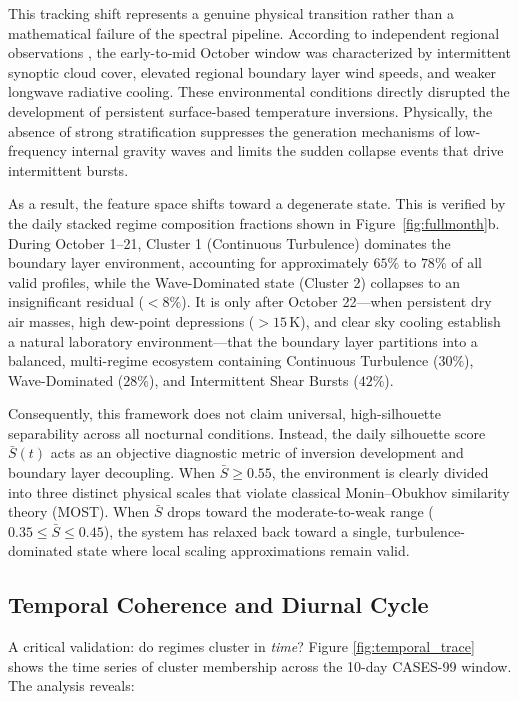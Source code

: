 \documentclass[11pt,a4paper]{article}
\begin{document}
This tracking shift represents a genuine physical transition rather than a mathematical failure of the spectral pipeline. According to independent regional observations \citep{Poulos2002}, the early-to-mid October window was characterized by intermittent synoptic cloud cover, elevated regional boundary layer wind speeds, and weaker longwave radiative cooling. These environmental conditions directly disrupted the development of persistent surface-based temperature inversions. Physically, the absence of strong stratification suppresses the generation mechanisms of low-frequency internal gravity waves and limits the sudden collapse events that drive intermittent bursts.

As a result, the feature space shifts toward a degenerate state. This is verified by the daily stacked regime composition fractions shown in Figure~\ref{fig:fullmonth}b. During October 1--21, Cluster 1 (Continuous Turbulence) dominates the boundary layer environment, accounting for approximately $65\%$ to $78\%$ of all valid profiles, while the Wave-Dominated state (Cluster 2) collapses to an insignificant residual ($< 8\%$). It is only after October 22---when persistent dry air masses, high dew-point depressions ($> 15\,\text{K}$), and clear sky cooling establish a natural laboratory environment---that the boundary layer partitions into a balanced, multi-regime ecosystem containing Continuous Turbulence ($30\%$), Wave-Dominated ($28\%$), and Intermittent Shear Bursts ($42\%$).

Consequently, this framework does not claim universal, high-silhouette separability across all nocturnal conditions. Instead, the daily silhouette score $\bar{S}(t)$ acts as an objective diagnostic metric of inversion development and boundary layer decoupling. When $\bar{S} \ge 0.55$, the environment is clearly divided into three distinct physical scales that violate classical Monin--Obukhov similarity theory (MOST). When $\bar{S}$ drops toward the moderate-to-weak range ($0.35 \le \bar{S} \le 0.45$), the system has relaxed back toward a single, turbulence-dominated state where local scaling approximations remain valid.

\subsection{Temporal Coherence and Diurnal Cycle}
\label{sec:results:temporal}

A critical validation: do regimes cluster in \emph{time}? Figure \ref{fig:temporal_trace} shows the time series of cluster membership across the 10-day CASES-99 window. The analysis reveals:
\end{document}

